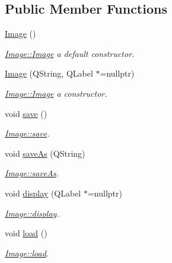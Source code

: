 \subsection*{Public Member Functions}
\begin{DoxyCompactItemize}
\item 
\mbox{\label{class_image_a58edd1c45b4faeb5f789b0d036d02313}} 
\mbox{\hyperlink{class_image_a58edd1c45b4faeb5f789b0d036d02313}{Image}} ()
\begin{DoxyCompactList}\small\item\em \mbox{\hyperlink{class_image_a58edd1c45b4faeb5f789b0d036d02313}{Image\+::\+Image}} a default constructor. \end{DoxyCompactList}\item 
\mbox{\hyperlink{class_image_aeb23ee6bbcab6102860403d6fa66565d}{Image}} (Q\+String, Q\+Label $\ast$=nullptr)
\begin{DoxyCompactList}\small\item\em \mbox{\hyperlink{class_image_a58edd1c45b4faeb5f789b0d036d02313}{Image\+::\+Image}} a constructor. \end{DoxyCompactList}\item 
void \mbox{\hyperlink{class_image_a643d9f46961e8372b6a573246aad66d1}{save}} ()
\begin{DoxyCompactList}\small\item\em \mbox{\hyperlink{class_image_a643d9f46961e8372b6a573246aad66d1}{Image\+::save}}. \end{DoxyCompactList}\item 
void \mbox{\hyperlink{class_image_a6398f48fdb7e200dd237e37644cca406}{save\+As}} (Q\+String)
\begin{DoxyCompactList}\small\item\em \mbox{\hyperlink{class_image_a6398f48fdb7e200dd237e37644cca406}{Image\+::save\+As}}. \end{DoxyCompactList}\item 
void \mbox{\hyperlink{class_image_a1ab17bfa8eb3bd96e90febe0ebf6b6f2}{display}} (Q\+Label $\ast$=nullptr)
\begin{DoxyCompactList}\small\item\em \mbox{\hyperlink{class_image_a1ab17bfa8eb3bd96e90febe0ebf6b6f2}{Image\+::display}}. \end{DoxyCompactList}\item 
void \mbox{\hyperlink{class_image_a183b754c660df8caed9088e9915606db}{load}} ()
\begin{DoxyCompactList}\small\item\em \mbox{\hyperlink{class_image_a183b754c660df8caed9088e9915606db}{Image\+::load}}. \end{DoxyCompactList}\item 

\end{DoxyCompactItemize}
